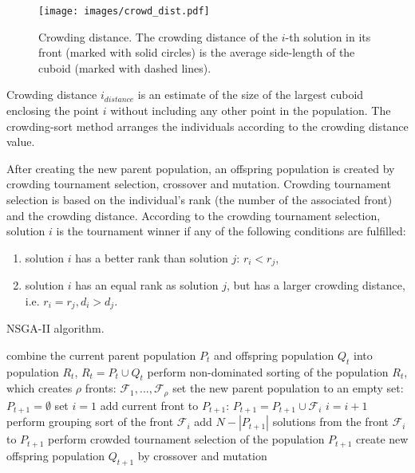 \begin{figure}[ht]
    \centering
    \texttt{[image: images/crowd\_dist.pdf]}
    \caption{Crowding distance. The crowding distance of the $i$-th solution in its front (marked with solid circles) is the average side-length of the cuboid (marked with dashed lines). }
    \label{crowding_dist}
\end{figure}

Crowding distance $i_{distance}$ is an estimate of the size of the largest cuboid enclosing the point $i$ without including any other point in the population. 
The crowding-sort method arranges the individuals according to the crowding distance value.

After creating the new parent population, an offspring population is created by crowding tournament selection, crossover and mutation. 
Crowding tournament selection is based on the individual's rank (the number of the associated front) and the crowding distance. 
According to the crowding tournament selection, solution $i$ is the tournament winner if any of the following conditions are fulfilled:
\begin{enumerate}
	\item solution $i$ has a better rank than solution $j$: $r_i < r_j$,
	\item solution $i$ has an equal rank as solution $j$, but has a larger crowding distance, i.e. $r_i=r_j, d_i > d_j$.
\end{enumerate}

\begin{algorithm}
\caption{NSGA-II algorithm.\label{nsga-ii}}
\begin{algorithmic}[1]
\State combine the current parent population $P_t$ and offspring population $Q_t$ into population $R_t$, $R_t = P_t \cup Q_t$
\State perform non-dominated sorting of the population $R_t$, which creates $\rho$ fronts: 
$\mathcal{F}_1, ..., \mathcal{F}_\rho$ 
\State set the new parent population to an empty set: $P_{t+1} = \emptyset$
\State set $i=1$
\State add current front to $P_{t+1}$: $P_{t+1} = P_{t+1} \cup \mathcal{F}_i$
\State $i=i+1$
\EndWhile
\State perform grouping sort of the front $\mathcal{F}_i$
\State add $N-|P_{t+1}|$ solutions from the front $\mathcal{F}_i$ to $P_{t+1}$
\State perform crowded tournament selection of the population $P_{t+1}$
\State create new offspring population $Q_{t+1}$ by crossover and mutation
\end{algorithmic}
\end{algorithm}

